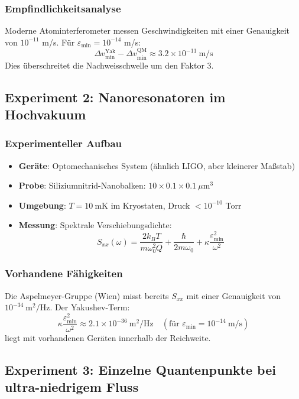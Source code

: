 \documentclass[11pt,a4paper]{article}
\begin{document}
	\subsubsection{Empfindlichkeitsanalyse}
	
	Moderne Atominterferometer messen Geschwindigkeiten mit einer Genauigkeit von $10^{-11}$ m/s. Für $\varepsilon_{\min} = 10^{-14}$ m/s:
	\[
	\Delta v_{\min}^{\text{Yak}} - \Delta v_{\min}^{\text{QM}} \approx 3.2 \times 10^{-11}\ \text{m/s}
	\]
	Dies überschreitet die Nachweisschwelle um den Faktor 3.
	
	\subsection{Experiment 2: Nanoresonatoren im Hochvakuum}
	
	\subsubsection{Experimenteller Aufbau}
	
	\begin{itemize}
		\item \textbf{Geräte}: Optomechanisches System (ähnlich LIGO, aber kleinerer Maßstab)
		\item \textbf{Probe}: Siliziumnitrid-Nanobalken: $10 \times 0.1 \times 0.1\ \mu\text{m}^3$
		\item \textbf{Umgebung}: $T = 10\ \text{mK}$ im Kryostaten, Druck $< 10^{-10}$ Torr
		\item \textbf{Messung}: Spektrale Verschiebungsdichte:
		\[
		S_{xx}(\omega) = \frac{2k_B T}{m\omega_0^2 Q} + \frac{\hbar}{2m\omega_0} + \kappa\frac{\varepsilon_{\min}^2}{\omega^2}
		\]
	\end{itemize}
	
	\subsubsection{Vorhandene Fähigkeiten}
	
	Die Aspelmeyer-Gruppe (Wien) misst bereits $S_{xx}$ mit einer Genauigkeit von $10^{-34}\ \text{m}^2/\text{Hz}$. Der Yakushev-Term:
	\[
	\kappa\frac{\varepsilon_{\min}^2}{\omega^2} \approx 2.1 \times 10^{-36}\ \text{m}^2/\text{Hz} \quad (\text{für } \varepsilon_{\min} = 10^{-14}\ \text{m/s})
	\]
	liegt mit vorhandenen Geräten innerhalb der Reichweite.
	
	\subsection{Experiment 3: Einzelne Quantenpunkte bei ultra-niedrigem Fluss}
	
\end{document}
